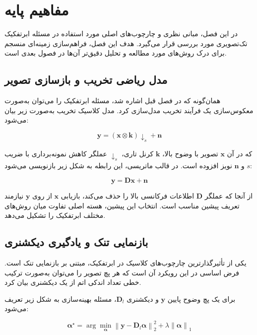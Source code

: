 \chapter{مفاهیم‌ پایه}

در این فصل، مبانی نظری و چارچوب‌های اصلی مورد استفاده در مسئله ابرتفکیک تک‌تصویری مورد بررسی قرار می‌گیرد. هدف این فصل، فراهم‌سازی زمینه‌ای منسجم برای درک روش‌های مورد مطالعه و تحلیل دقیق‌تر آن‌ها در فصول بعدی است.

\section{مدل ریاضی تخریب و بازسازی تصویر}

همان‌گونه که در فصل قبل اشاره شد، مسئله ابرتفکیک را می‌توان به‌صورت معکوس‌سازی یک فرآیند تخریب مدل‌سازی کرد. مدل کلاسیک تخریب به‌صورت زیر بیان می‌شود:

\begin{equation}
	\mathbf{y} = (\mathbf{x} \otimes \mathbf{k}) \downarrow_s + \mathbf{n}
\end{equation}

که در آن $\mathbf{x}$ تصویر با وضوح بالا، $\mathbf{k}$ کرنل تاری، $\downarrow_s$ عملگر کاهش نمونه‌برداری با ضریب $s$ و $\mathbf{n}$ نویز افزوده است. در قالب ماتریسی، این رابطه به شکل زیر بازنویسی می‌شود:

\begin{equation}
	\mathbf{y} = \mathbf{D}\mathbf{x} + \mathbf{n}
\end{equation}

از آنجا که عملگر $\mathbf{D}$ اطلاعات فرکانسی بالا را حذف می‌کند، بازیابی $\mathbf{x}$ از روی $\mathbf{y}$ نیازمند تعریف پیشین مناسب است. انتخاب این پیشین، هسته اصلی تفاوت میان روش‌های مختلف ابرتفکیک را تشکیل می‌دهد.

\section{بازنمایی تنک و یادگیری دیکشنری}

یکی از تأثیرگذارترین چارچوب‌های کلاسیک در ابرتفکیک، مبتنی بر بازنمایی تنک است. فرض اساسی در این رویکرد آن است که هر پچ تصویر را می‌توان به‌صورت ترکیب خطی تعداد اندکی اتم از یک دیکشنری بیان کرد.

برای یک پچ وضوح پایین $\mathbf{y}$ و دیکشنری $\mathbf{D}_l$، مسئله بهینه‌سازی به شکل زیر تعریف می‌شود:

\begin{equation}
	\boldsymbol{\alpha}^\star =
	\arg\min_{\boldsymbol{\alpha}}
	\left\|
	\mathbf{y} - \mathbf{D}_l \boldsymbol{\alpha}
	\right\|_2^2
	+
	\lambda
	\left\|
	\boldsymbol{\alpha}
	\right\|_1
\end{equation}


